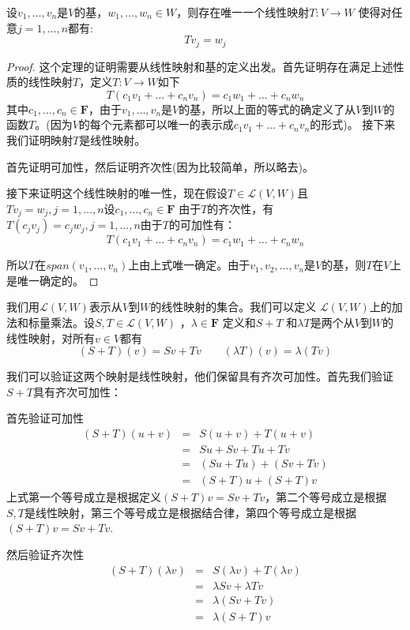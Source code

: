 \documentclass[10pt,a4paper,UTF8]{article}
\begin{document}
\begin{theorem}
设\(v_{1},\ldots ,v_{n}\)是\(V\)的基，\(w_{1},\ldots ,w_{n}\in W\)，则存在唯一一个线性映射\(T:V\rightarrow W\) 使得对任意\(j=1,\ldots ,n\)都有:\[Tv_{j} = w_{j}\]
\end{theorem}
\begin{proof}
这个定理的证明需要从线性映射和基的定义出发。首先证明存在满足上述性质的线性映射\(T\)，定义\(T:V\rightarrow W\)如下\[T(c_{1}v_{1}+ \ldots + c_{n}v_{n}) = c_{1}w_{1} + \ldots + c_{n}w_{n}\] 其中\(c_{1},\ldots ,c_{n}\in \mathbf{F}\)，由于\(v_{1},\ldots ,v_{n}\)是\(V\)的基，所以上面的等式的确定义了从\(V\)到\(W\)的函数\(T\)。(因为\(V\)的每个元素都可以唯一的表示成\(c_{1}v_{1} +\ldots +c_{n}v_{n}\)的形式)。 接下来我们证明映射\(T\)是线性映射。

首先证明可加性，然后证明齐次性(因为比较简单，所以略去)。

接下来证明这个线性映射的唯一性，现在假设\(T\in \mathcal{L}(V,W)\)且\(Tv_{j} = w_{j},j = 1,\ldots ,n\)设\(c_{1},\ldots ,c_{n}\in \mathbf{F}\) 由于\(T\)的齐次性，有\(T(c_{j}v_{j}) = c_{j}w_{j},j = 1,\ldots ,n\)由于\(T\)的可加性有：
\[T(c_{1}v_{1} + \ldots + c_{n}v_{n}) = c_{1}w_{1} + \ldots + c_{n}w_{n}\]

所以\(T\)在\(span(v_{1},\ldots ,v_{n})\)上由上式唯一确定。由于\(v_{1},v_{2},\ldots ,v_{n}\)是\(V\)的基，则\(T\)在\(V\)上是唯一确定的。
\end{proof}

我们用\(\mathcal{L}(V,W)\)表示从\(V\)到\(W\)的线性映射的集合。我们可以定义 \(\mathcal{L}(V,W)\)上的加法和标量乘法。设\(S,T\in \mathcal{L}(V,W)\) ，\(\lambda \in \mathbf{F}\) 定义和\(S+T\) 和\(\lambda T\)是两个从\(V\)到\(W\)的线性映射，对所有\(v\in V\)都有\[(S+T)(v) = Sv + Tv \qquad (\lambda T)(v) = \lambda (Tv)\]

我们可以验证这两个映射是线性映射，他们保留具有齐次可加性。首先我们验证 \(S+T\)具有齐次可加性：

首先验证可加性
\begin{eqnarray*}
(S+T)(u+v)&=& S(u+v) + T(u+v) \\
&=&Su + Sv + Tu + Tv \\
&=& (Su + Tu) + (Sv + Tv) \\
&=& (S+T)u + (S+T)v
\end{eqnarray*}
上式第一个等号成立是根据定义\((S+T)v = Sv + Tv\)，第二个等号成立是根据\(S,T\)是线性映射，第三个等号成立是根据结合律，第四个等号成立是根据\((S+T)v = Sv + Tv\).

然后验证齐次性
\begin{eqnarray*}
(S+T)(\lambda v)&=& S(\lambda v) + T(\lambda v) \\
&=& \lambda Sv + \lambda Tv \\
&=& \lambda (Sv + Tv) \\
&=& \lambda(S+T)v
\end{eqnarray*}
\end{document}
